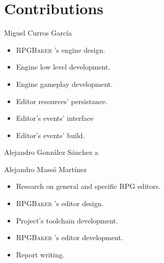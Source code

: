 \documentclass{beamer}
\newcommand{\baker}{%
	\textsc{RPGBaker}%
}
\begin{document}
\section{Contributions}
\begin{frame}{Miguel Curros García}
	\begin{itemize}
		\item \baker{}'s engine design.
		\item Engine low level development.
		\item Engine gameplay development.
		\item Editor resources' persistance.
		\item Editor's events' interface
		\item Editor's events' build.
	\end{itemize}
\end{frame}

\begin{frame}{Alejandro González Sánchez}
a
\end{frame}

\begin{frame}{Alejandro Massó Martínez}
	\begin{itemize}
		\item Research on general and specific RPG editors.
		\item \baker{}'s editor design.
		\item Project's toolchain development.
		\item \baker{}'s editor development.
		\item Report writing.
	\end{itemize}
\end{frame}
\end{document}
